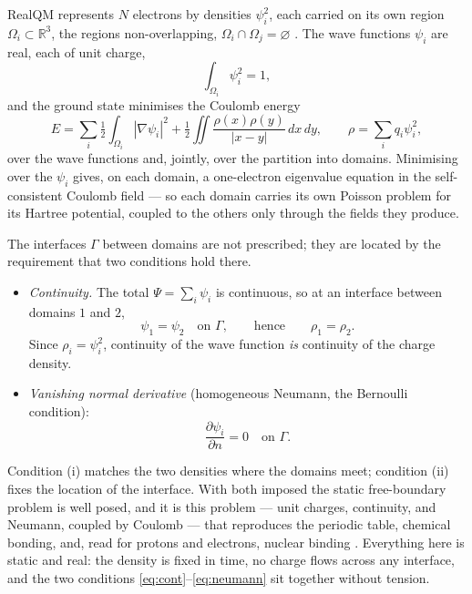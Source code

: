 \documentclass[11pt]{article}
\begin{document}
RealQM represents $N$ electrons by densities $\psi_i^2$, each carried on its own region
$\Omega_i\subset\mathbb R^3$, the regions non-overlapping, $\Omega_i\cap\Omega_j=\varnothing$
\cite{RealQM}. The wave functions $\psi_i$ are real, each of unit charge,
\begin{equation}
\int_{\Omega_i}\psi_i^2=1 ,
\label{eq:unit}
\end{equation}
and the ground state minimises the Coulomb energy
\begin{equation}
E=\sum_i\tfrac12\!\int_{\Omega_i}|\nabla\psi_i|^2+\tfrac12\!\iint\frac{\rho(x)\rho(y)}{|x-y|}\,dx\,dy,
\qquad \rho=\sum_i q_i\psi_i^2 ,
\label{eq:E}
\end{equation}
over the wave functions and, jointly, over the partition into domains. Minimising over the $\psi_i$ gives,
on each domain, a one-electron eigenvalue equation in the self-consistent Coulomb field --- so each domain
carries its own Poisson problem for its Hartree potential, coupled to the others only through the fields
they produce.

The interfaces $\Gamma$ between domains are not prescribed; they are located by the requirement that two
conditions hold there.
\begin{itemize}
\item[(i)] \emph{Continuity.} The total $\Psi=\sum_i\psi_i$ is continuous, so at an interface between
domains $1$ and $2$,
\begin{equation}
\psi_1=\psi_2\quad\text{on }\Gamma,\qquad\text{hence}\qquad \rho_1=\rho_2 .
\label{eq:cont}
\end{equation}
Since $\rho_i=\psi_i^2$, continuity of the wave function \emph{is} continuity of the charge density.
\item[(ii)] \emph{Vanishing normal derivative} (homogeneous Neumann, the Bernoulli condition):
\begin{equation}
\frac{\partial\psi_i}{\partial n}=0\quad\text{on }\Gamma .
\label{eq:neumann}
\end{equation}
\end{itemize}
Condition (i) matches the two densities where the domains meet; condition (ii) fixes the location of the
interface. With both imposed the static free-boundary problem is well posed, and it is this problem --- unit
charges, continuity, and Neumann, coupled by Coulomb --- that reproduces the periodic table, chemical
bonding, and, read for protons and electrons, nuclear binding \cite{RealQM,RealNucleus}. Everything here is
static and real: the density is fixed in time, no charge flows across any interface, and the two conditions
\eqref{eq:cont}--\eqref{eq:neumann} sit together without tension.
\end{document}
